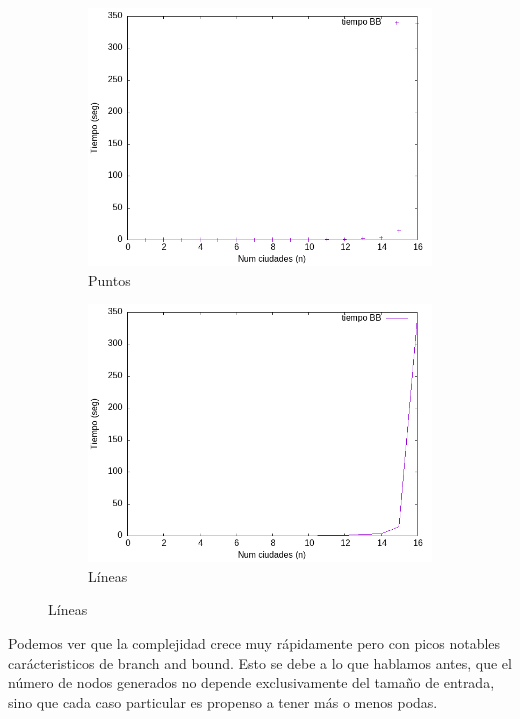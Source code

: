 \documentclass{article}
\begin{document}
\begin{figure}[H]
    \centering
    \begin{subfigure}[b]{0.45\textwidth}
        \centering
        \includegraphics[width=\textwidth]{imagenes/cota1/ef_bb/TSP_BB_empirica_points.png}
        \caption{Puntos}
    \end{subfigure}
    \begin{subfigure}[b]{0.45\textwidth}
        \centering
        \includegraphics[width=\textwidth]{imagenes/cota1/ef_bb/TSP_BB_empirica_lines.png}
        \caption{Líneas}
    \end{subfigure}
\end{figure}

Podemos ver que la complejidad crece muy rápidamente pero con picos notables carácteristicos de branch and bound. Esto se debe a lo que hablamos antes, que el número de nodos generados no depende exclusivamente del tamaño de entrada, sino que cada caso particular es propenso a tener más o menos podas.
 
\end{document}
